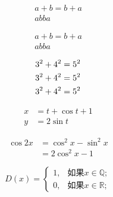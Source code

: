\documentclass{ctexart}
\begin{document}
	
	\begin{gather}	
		a + b = b + a \\
		ab ba
	\end{gather}
	
	\begin{gather*}
		a + b = b + a \\
		ab ba
	\end{gather*}

	\begin{gather}
		3^2 + 4^2 = 5^2 \notag \\
		3^2 + 4^2 = 5^2 \notag \\
		3^2 + 4^2 = 5^2 
	\end{gather}

	\begin{align}
		x &= t + \cos t + 1 \\
		y &= 2\sin t 
	\end{align}

	\begin{equation}
		\begin{split}
			\cos 2x &= \cos^2 x - \sin^2 x \\
			&= 2\cos^2 x -1 
		\end{split}
	\end{equation}

	\begin{equation}
		D(x) = 
		\begin{cases}
			1,& \text{如果} x \in \mathbb{Q}; \\	%
			0,& \text{如果} x \in \mathbb{R};
		\end{cases}
	\end{equation}
	
\end{document}
